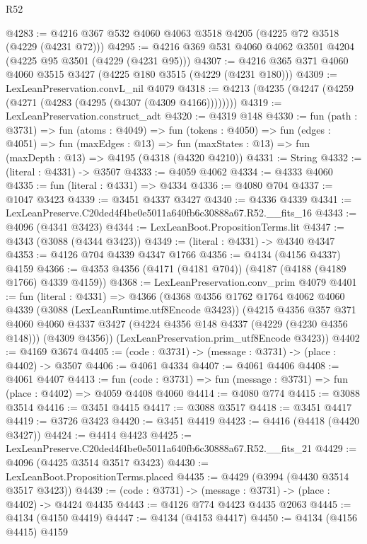 \begin{lexlean}{R52}
\begin{coremodule}
@4283 := @4216 @367 @532 @4060 @4063 @3518 @4205 (@4225 @72 @3518 (@4229 (@4231 @72)))
@4295 := @4216 @369 @531 @4060 @4062 @3501 @4204 (@4225 @95 @3501 (@4229 (@4231 @95)))
@4307 := @4216 @365 @371 @4060 @4060 @3515 @3427 (@4225 @180 @3515 (@4229 (@4231 @180)))
@4309 := LexLeanPreservation.convL_nil @4079
@4318 := @4213 (@4235 (@4247 (@4259 (@4271 (@4283 (@4295 (@4307 (@4309 @4166))))))))
@4319 := LexLeanPreservation.construct_adt
@4320 := @4319 @148
@4330 := fun (path : @3731) =>
  fun (atoms : @4049) =>
  fun (tokens : @4050) =>
  fun (edges : @4051) =>
  fun (maxEdges : @13) =>
  fun (maxStates : @13) => fun (maxDepth : @13) => @4195 (@4318 (@4320 @4210))
@4331 := String
@4332 := (literal : @4331) -> @3507
@4333 := @4059 @4062
@4334 := @4333 @4060
@4335 := fun (literal : @4331) => @4334
@4336 := @4080 @704
@4337 := @1047 @3423
@4339 := @3451 @4337 @3427
@4340 := @4336 @4339
@4341 := LexLeanPreserve.C20ded4f4be0e5011a640fb6c30888a67.R52.__fits_16
@4343 := @4096 (@4341 @3423)
@4344 := LexLeanBoot.PropositionTerms.lit
@4347 := @4343 (@3088 (@4344 @3423))
@4349 := (literal : @4331) -> @4340 @4347
@4353 := @4126 @704 @4339 @4347 @1766
@4356 := @4134 (@4156 @4337) @4159
@4366 := @4353 @4356 (@4171 (@4181 @704)) (@4187 (@4188 (@4189 @1766) @4339 @4159))
@4368 := LexLeanPreservation.conv_prim @4079
@4401 := fun (literal : @4331) =>
  @4366
    (@4368
      @4356
      @1762
      @1764
      @4062
      @4060
      @4339
      (@3088 (LexLeanRuntime.utf8Encode @3423))
      (@4215
        @4356
        @357
        @371
        @4060
        @4060
        @4337
        @3427
        (@4224 @4356 @148 @4337 (@4229 (@4230 @4356 @148)))
        (@4309 @4356))
      (LexLeanPreservation.prim_utf8Encode @3423))
@4402 := @4169 @3674
@4405 := (code : @3731) -> (message : @3731) -> (place : @4402) -> @3507
@4406 := @4061 @4334
@4407 := @4061 @4406
@4408 := @4061 @4407
@4413 := fun (code : @3731) => fun (message : @3731) => fun (place : @4402) => @4059 @4408 @4060
@4414 := @4080 @774
@4415 := @3088 @3514
@4416 := @3451 @4415
@4417 := @3088 @3517
@4418 := @3451 @4417
@4419 := @3726 @3423
@4420 := @3451 @4419
@4423 := @4416 (@4418 (@4420 @3427))
@4424 := @4414 @4423
@4425 := LexLeanPreserve.C20ded4f4be0e5011a640fb6c30888a67.R52.__fits_21
@4429 := @4096 (@4425 @3514 @3517 @3423)
@4430 := LexLeanBoot.PropositionTerms.placed
@4435 := @4429 (@3994 (@4430 @3514 @3517 @3423))
@4439 := (code : @3731) -> (message : @3731) -> (place : @4402) -> @4424 @4435
@4443 := @4126 @774 @4423 @4435 @2063
@4445 := @4134 (@4150 @4419)
@4447 := @4134 (@4153 @4417)
@4450 := @4134 (@4156 @4415) @4159

\end{coremodule}
\end{lexlean}
